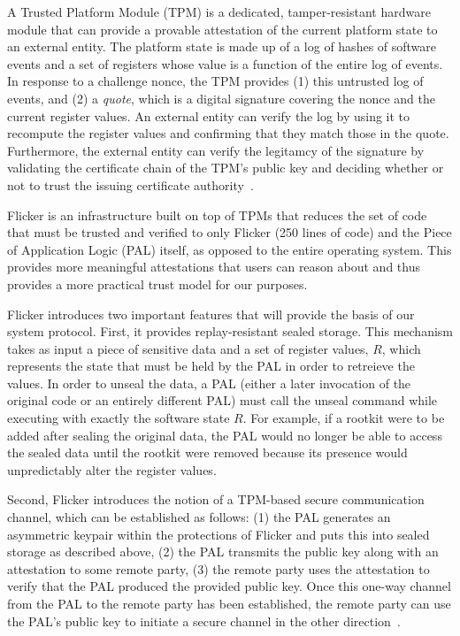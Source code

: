 \documentclass{article}
\begin{document}
A Trusted Platform Module (TPM) is a dedicated, tamper-resistant hardware module that can provide a provable attestation of the current platform state to an external entity. The platform state is made up of a log of hashes of software events and a set of registers whose value is a function of the entire log of events. In response to a challenge nonce, the TPM provides (1) this untrusted log of events, and (2) a \textit{quote}, which is a digital signature covering the nonce and the current register values. An external entity can verify the log by using it to recompute the register values and confirming that they match those in the quote. Furthermore, the external entity can verify the legitamcy of the signature by validating the certificate chain of the TPM's public key and deciding whether or not to trust the issuing certificate authority~\cite{tpm-iso}.

Flicker is an infrastructure built on top of TPMs that reduces the set of code that must be trusted and verified to only Flicker (250 lines of code) and the Piece of Application Logic (PAL) itself, as opposed to the entire operating system. This provides more meaningful attestations that users can reason about and thus provides a more practical trust model for our purposes.

Flicker introduces two important features that will provide the basis of our system protocol.
First, it provides replay-resistant sealed storage. This mechanism takes as input a piece of sensitive data and a set of register values, $R$, which represents the state that must be held by the PAL in order to retreieve the values. In order to unseal the data, a PAL (either a later invocation of the original code or an entirely different PAL) must call the unseal command while executing with exactly the software state $R$. For example, if a rootkit were to be added after sealing the original data, the PAL would no longer be able to access the sealed data until the rootkit were removed because its presence would unpredictably alter the register values.

Second, Flicker introduces the notion of a TPM-based secure communication channel, which can be established as follows: (1) the PAL generates an asymmetric keypair within the protections of Flicker and puts this into sealed storage as described above, (2) the PAL transmits the public key along with an attestation to some remote party, (3) the remote party uses the attestation to verify that the PAL produced the provided public key. Once this one-way channel from the PAL to the remote party has been established, the remote party can use the PAL's public key to initiate a secure channel in the other direction~\cite{flicker}.
\end{document}
